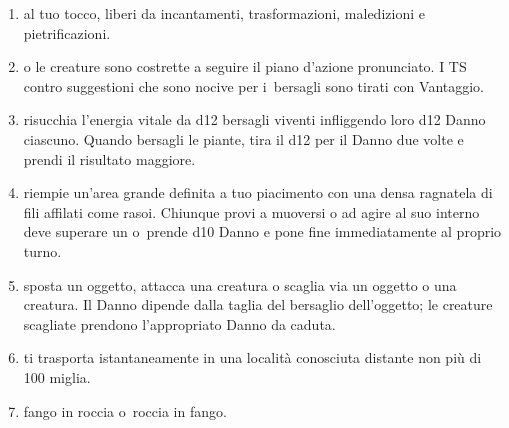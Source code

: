 \documentclass[itdr]{subfiles}
\begin{document}
\begin{enumerate}
	\item {} al tuo tocco, liberi da incantamenti, trasformazioni, maledizioni e pietrificazioni.
	\item {}  o le creature sono costrette a seguire il piano d'azione pronunciato. I TS contro suggestioni che sono nocive per i~bersagli sono tirati con Vantaggio.
	\item {} risucchia l'energia vitale da d12 bersagli viventi infliggendo loro d12 Danno ciascuno. Quando bersagli le piante, tira il d12 per il Danno due volte e prendi il risultato maggiore.
	\item {} riempie un'area grande definita a tuo piacimento con una densa ragnatela di fili affilati come rasoi. Chiunque provi a muoversi o ad agire al suo interno deve superare un  o~prende d10 Danno e pone fine immediatamente al proprio turno.
	\item {} sposta un oggetto, attacca una creatura o scaglia via un oggetto o una creatura. Il Danno \mbox{dipende} dalla taglia del bersaglio dell'oggetto; le creature scagliate prendono l'appropriato Danno da caduta.
	\item {} ti trasporta istantaneamente in una località conosciuta distante non più di 100 miglia.
	\item {} fango in roccia o~roccia in fango.
\end{enumerate}

\vfill
\break
\end{document}
